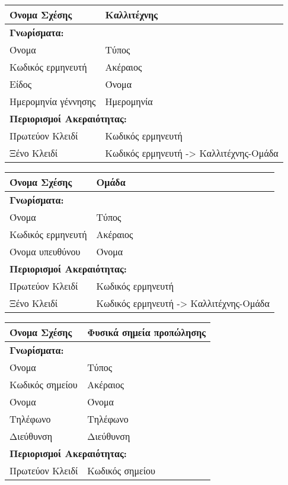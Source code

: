 \begin{tabular}{|p{6cm}|p{8cm}|}
  \hline
  Όνομα Σχέσης        & Καλλιτέχνης                   \\ \hline
  \multicolumn{2}{|l|}{\textbf{Γνωρίσματα:}}               \\ \hline
  Όνομα               & Τύπος                              \\ \hline
  Κωδικός ερμηνευτή   & Ακέραιος                           \\ \hline
  Είδος               & Όνομα                              \\ \hline
  Ημερομηνία γέννησης & Ημερομηνία                         \\ \hline
  \multicolumn{2}{|l|}{\textbf{Περιορισμοί Ακεραιότητας:}} \\ \hline
  Πρωτεύον Κλειδί     & Κωδικός ερμηνευτή                  \\ \hline
  Ξένο Κλειδί         & Κωδικός ερμηνευτή -> Καλλιτέχνης-Ομάδα                  \\ \hline
\end{tabular}

\begin{tabular}{|p{6cm}|p{8cm}|}
  \hline
  Όνομα Σχέσης        & Ομάδα                   \\ \hline
  \multicolumn{2}{|l|}{\textbf{Γνωρίσματα:}}               \\ \hline
  Όνομα               & Τύπος                              \\ \hline
  Κωδικός ερμηνευτή   & Ακέραιος                           \\ \hline
  Όνομα υπευθύνου     & Όνομα                              \\ \hline
  \multicolumn{2}{|l|}{\textbf{Περιορισμοί Ακεραιότητας:}} \\ \hline
  Πρωτεύον Κλειδί     & Κωδικός ερμηνευτή                  \\ \hline
  Ξένο Κλειδί         & Κωδικός ερμηνευτή -> Καλλιτέχνης-Ομάδα                  \\ \hline
\end{tabular}


\begin{tabular}{|p{6cm}|p{8cm}|}
  \hline
  Όνομα Σχέσης    & Φυσικά σημεία προπώλησης               \\ \hline
  \multicolumn{2}{|l|}{\textbf{Γνωρίσματα:}}               \\ \hline
  Όνομα           & Τύπος                                  \\ \hline
  Κωδικός σημείου & Ακέραιος                               \\ \hline
  Όνομα           & Όνομα                                  \\ \hline
  Τηλέφωνο        & Τηλέφωνο                               \\ \hline
  Διεύθυνση       & Διεύθυνση                              \\ \hline
  \multicolumn{2}{|l|}{\textbf{Περιορισμοί Ακεραιότητας:}} \\ \hline
  Πρωτεύον Κλειδί & Κωδικός σημείου                        \\ \hline
\end{tabular}



